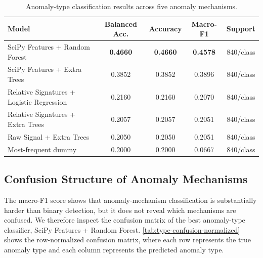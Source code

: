 \begin{table}[htbp]
\centering
\caption{Anomaly-type classification results across five anomaly mechanisms.}
\label{tab:type-classification}
\begin{tabular}{lcccc}
\toprule
\textbf{Model} & \textbf{Balanced Acc.} & \textbf{Accuracy} & \textbf{Macro-F1} & \textbf{Support} \\
\midrule
SciPy Features + Random Forest & \textbf{0.4660} & \textbf{0.4660} & \textbf{0.4578} & 840/class \\
SciPy Features + Extra Trees & 0.3852 & 0.3852 & 0.3896 & 840/class \\
Relative Signatures + Logistic Regression & 0.2160 & 0.2160 & 0.2070 & 840/class \\
Relative Signatures + Extra Trees & 0.2057 & 0.2057 & 0.2051 & 840/class \\
Raw Signal + Extra Trees & 0.2050 & 0.2050 & 0.2051 & 840/class \\
Most-frequent dummy & 0.2000 & 0.2000 & 0.0667 & 840/class \\
\bottomrule
\end{tabular}
\end{table}

\subsection{Confusion Structure of Anomaly Mechanisms}

The macro-F1 score shows that anomaly-mechanism classification is substantially harder than binary detection, but it does not reveal which mechanisms are confused. We therefore inspect the confusion matrix of the best anomaly-type classifier, SciPy Features + Random Forest. \cref{tab:type-confusion-normalized} shows the row-normalized confusion matrix, where each row represents the true anomaly type and each column represents the predicted anomaly type.

\begin{table}[htbp]
\centering
\caption{Row-normalized confusion matrix for anomaly-type classification using SciPy Features + Random Forest. Rows indicate true anomaly type and columns indicate predicted anomaly type.}
\label{tab:type-confusion-normalized}
\end{table}


